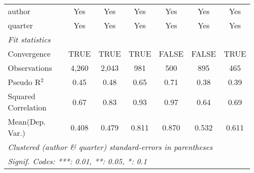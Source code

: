 \begin{tabular}{lcccccc}
   author                                                     & Yes          & Yes           & Yes           & Yes           & Yes          & Yes\\  
   quarter                                                    & Yes          & Yes           & Yes           & Yes           & Yes          & Yes\\  
   \midrule
   \emph{Fit statistics}\\
   Convergence                                                &TRUE          & TRUE          & TRUE          & FALSE         & FALSE        & TRUE\\  
   Observations                                               & 4,260        & 2,043         & 981           & 500           & 895          & 465\\  
   Pseudo R$^2$                                               & 0.45         & 0.48          & 0.65          & 0.71          & 0.38         & 0.39\\  
   Squared Correlation                                        & 0.67         & 0.83          & 0.93          & 0.97          & 0.64         & 0.69\\  
Mean(Dep. Var.) & 0.408 & 0.479 & 0.811 & 0.870 & 0.532 & 0.611 \\
   \midrule \midrule
   \multicolumn{7}{l}{\emph{Clustered (author \& quarter) standard-errors in parentheses}}\\
   \multicolumn{7}{l}{\emph{Signif. Codes: ***: 0.01, **: 0.05, *: 0.1}}\\
\end{tabular}
\par\endgroup
